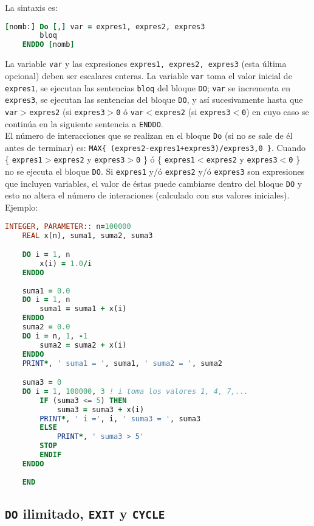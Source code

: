 La sintaxis es:

\begin{lstlisting}[language=Fortran]
	[nomb:] Do [,] var = expres1, expres2, expres3 
		bloq
	ENDDO [nomb]
\end{lstlisting}

La variable {\tt var} y las expresiones {\tt expres1, expres2, expres3} (esta última opcional) deben ser escalares enteras. La variable {\tt var} toma el valor inicial de {\tt expres1}, se ejecutan las sentencias {\tt bloq} del bloque {\tt DO}; {\tt var} se incrementa en {\tt expres3}, se ejecutan las sentencias del bloque {\tt DO}, y así sucesivamente hasta que {\tt var$>$expres2} (si {\tt expres3$>$0} ó  {\tt var$<$expres2} (si {\tt expres3$<$0}) en cuyo caso se continúa en la siguiente sentencia a {\tt ENDDO}. \\

El número de interacciones que se realizan en el bloque {\tt Do} (si no se sale de él antes de terminar) es: {\tt MAX\{ (expres2-expres1+expres3)/expres3,0 \}}. Cuando \{ {\tt expres1$>$expres2} y {\tt expres3$>$0} \}  ó \{ {\tt expres1$<$expres2} y {\tt expres3$<$0} \}  no se ejecuta el bloque {\tt DO}. Si {\tt expres1} y/ó {\tt expres2} y/ó {\tt expres3} son expresiones que incluyen variables, el valor de éstas puede cambiarse dentro del bloque  {\tt DO} y esto no altera el número de interaciones (calculado con sus valores iniciales). Ejemplo:

\begin{lstlisting}[language=Fortran]
	INTEGER, PARAMETER:: n=100000
	REAL x(n), suma1, suma2, suma3

	DO i = 1, n
		x(i) = 1.0/i
	ENDDO
	
	suma1 = 0.0
	DO i = 1, n
		suma1 = suma1 + x(i)
	ENDDO
	suma2 = 0.0
	DO i = n, 1, -1
		suma2 = suma2 + x(i)
	ENDDO
	PRINT*, ' suma1 = ', suma1, ' suma2 = ', suma2

	suma3 = 0
	DO i = 1, 100000, 3 ! i toma los valores 1, 4, 7,...
		IF (suma3 <= 5) THEN
			suma3 = suma3 + x(i)
		PRINT*, ' i =', i, ' suma3 = ', suma3
		ELSE
			PRINT*, ' suma3 > 5'
		STOP
		ENDIF
	ENDDO
	
	END
\end{lstlisting}




\subsection{{\tt DO} ilimitado, {\tt EXIT} y {\tt CYCLE}}

